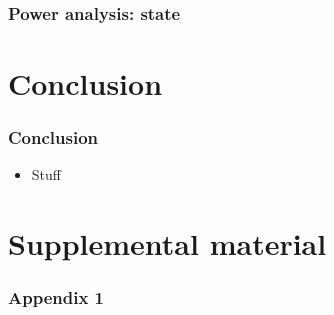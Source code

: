 \documentclass[usenames,dvipsnames]{beamer}
\begin{document}

\begin{frame}
\frametitle{Power analysis: state}


\end{frame}


\section{Conclusion}

\begin{frame}
\frametitle{Conclusion}

\begin{itemize}
\item Stuff
\end{itemize}

\end{frame}


\appendix

\section{Supplemental material}

\begin{frame}[label= appendix1]
\frametitle{Appendix 1}


\end{frame}
\end{document}
